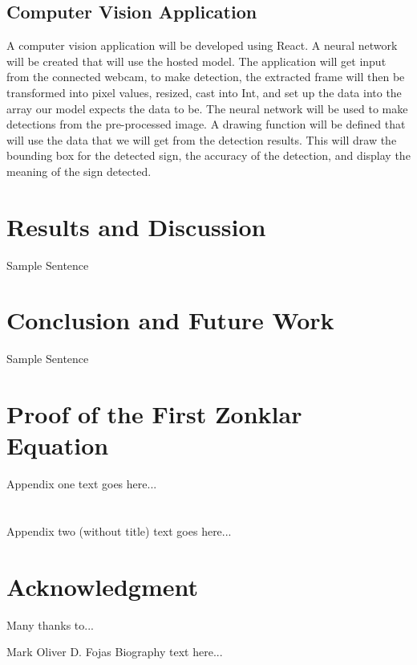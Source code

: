 \documentclass[journal]{./IEEE/IEEEtran}
\newcommand{\ADVISEE}{Mark Oliver D. Fojas}
\begin{document}
\subsection{Computer Vision Application}
\par
A computer vision application will be developed using React. A neural network will be created that will use the hosted model. The application will get input from the connected webcam, to make detection, the extracted frame will then be transformed into pixel values, resized, cast into Int, and set up the data into the array our model expects the data to be. The neural network will be used to make detections from the pre-processed image. A drawing function will be defined that will use the data that we will get from the detection results. This will draw the bounding box for the detected sign, the accuracy of the detection, and display the meaning of the sign detected. 

\section{Results and Discussion}
Sample Sentence

\section{Conclusion and Future Work}
Sample Sentence

\appendices

\section{Proof of the First Zonklar Equation}
Appendix one text goes here...

\section{}
Appendix two (without title) text goes here...

\section*{Acknowledgment}
Many thanks to...


% 

\begin{biography}{\ADVISEE}
Biography text here...
\end{biography}
\end{document}
